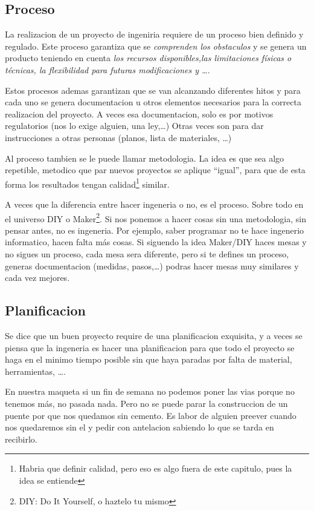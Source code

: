 \subsection{Proceso}
La realizacion de un proyecto de ingeniria requiere de un proceso bien definido y regulado.
Este proceso garantiza que se \textit{comprenden los obstaculos} y se genera un producto
teniendo en cuenta \textit{los recursos disponibles,las limitaciones físicas o técnicas,
    la flexibilidad  para futuras modificaciones y \dots}.

Estos procesos ademas garantizan que se van alcanzando diferentes hitos y para cada uno se
genera documentacion u otros elementos necesarios para la correcta realizacion del proyecto.
A veces esa documentacion, solo es por motivos regulatorios (nos lo exige alguien, una ley,\dots)
Otras veces son para dar instrucciones a otras personas (planos, lista de materiales, \dots)

Al proceso tambien se le puede llamar metodologia. La idea es que sea algo repetible, metodico
que par nuevos proyectos se aplique ``igual'', para que de esta forma los resultados tengan
calidad\footnote{Habria que definir calidad, pero eso es algo fuera de este capitulo, pues
    la idea se entiende} similar.

A veces que la diferencia entre hacer ingeneria o no, es el proceso. Sobre todo en el universo
DIY o Maker\footnote{DIY: Do It Yourself, o haztelo tu mismo}. Si nos ponemos a hacer cosas
sin una metodologia, sin pensar antes, no es ingeneria. Por ejemplo, saber programar no te hace
ingenerio informatico, hacen falta más cosas. Si siguendo la idea Maker/DIY haces mesas y
no sigues un proceso, cada mesa sera diferente, pero si te defines un proceso, generas
documentacion (medidas, pasos,\dots) podras hacer mesas muy similares y cada vez mejores.

\subsection{Planificacion}
Se dice que un buen proyecto require de una planificacion exquisita, y a veces se piensa que la
ingeneria es hacer una planificacion para que todo el proyecto se haga en el minimo tiempo
posible sin que haya paradas por falta de material, herramientas, \dots.

En nuestra maqueta si un fin de semana no podemos poner las vias porque no tenemos más,
no pasada nada. Pero no se puede parar la construccion de un puente por que nos quedamos
sin cemento. Es labor de alguien preever cuando nos quedaremos sin el y pedir con
antelacion sabiendo lo que se tarda en recibirlo.

